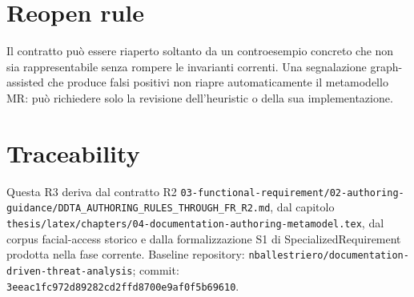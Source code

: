 \documentclass[11pt,a4paper]{article}
\newcommand{\artifact}[1]{\nolinkurl{#1}}
\begin{document}
\section{Reopen rule}
Il contratto può essere riaperto soltanto da un controesempio concreto che non sia rappresentabile senza rompere le invarianti correnti. Una segnalazione graph-assisted che produce falsi positivi non riapre automaticamente il metamodello MR: può richiedere solo la revisione dell'heuristic o della sua implementazione.

\appendix
\section{Traceability}
Questa R3 deriva dal contratto R2 \artifact{03-functional-requirement/02-authoring-guidance/DDTA_AUTHORING_RULES_THROUGH_FR_R2.md}, dal capitolo \artifact{thesis/latex/chapters/04-documentation-authoring-metamodel.tex}, dal corpus facial-access storico e dalla formalizzazione S1 di SpecializedRequirement prodotta nella fase corrente. Baseline repository: \artifact{nballestriero/documentation-driven-threat-analysis}; commit: \artifact{3eeac1fc972d89282cd2ffd8700e9af0f5b69610}.
\end{document}

